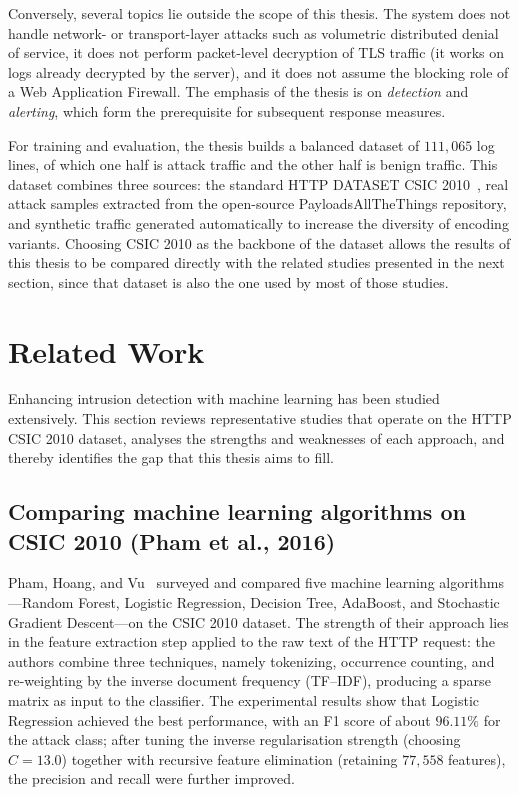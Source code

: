Conversely, several topics lie outside the scope of this thesis. The
system does not handle network- or transport-layer attacks such as
volumetric distributed denial of service, it does not perform packet-level
decryption of TLS traffic (it works on logs already decrypted by the
server), and it does not assume the blocking role of a Web Application
Firewall. The emphasis of the thesis is on \emph{detection} and
\emph{alerting}, which form the prerequisite for subsequent response
measures.

For training and evaluation, the thesis builds a balanced dataset of
$111{,}065$ log lines, of which one half is attack traffic and the other
half is benign traffic. This dataset combines three sources: the standard
HTTP DATASET CSIC 2010~\cite{csic2010}, real attack samples extracted from
the open-source PayloadsAllTheThings repository, and synthetic traffic
generated automatically to increase the diversity of encoding variants.
Choosing CSIC 2010 as the backbone of the dataset allows the results of
this thesis to be compared directly with the related studies presented in
the next section, since that dataset is also the one used by most of those
studies.

\section{Related Work}
\label{sec:related}

Enhancing intrusion detection with machine learning has been studied
extensively. This section reviews representative studies that operate on
the HTTP CSIC 2010 dataset, analyses the strengths and weaknesses of each
approach, and thereby identifies the gap that this thesis aims to fill.

\subsection{Comparing machine learning algorithms on CSIC 2010
(Pham et al., 2016)}

Pham, Hoang, and Vu~\cite{pham2016} surveyed and compared five machine
learning algorithms---Random Forest, Logistic Regression, Decision Tree,
AdaBoost, and Stochastic Gradient Descent---on the CSIC 2010 dataset. The
strength of their approach lies in the feature extraction step applied to
the raw text of the HTTP request: the authors combine three techniques,
namely tokenizing, occurrence counting, and re-weighting by the inverse
document frequency (TF--IDF), producing a sparse matrix as input to the
classifier. The experimental results show that Logistic Regression
achieved the best performance, with an F1 score of about $96.11\%$ for the
attack class; after tuning the inverse regularisation strength (choosing
$C = 13.0$) together with recursive feature elimination (retaining
$77{,}558$ features), the precision and recall were further improved.

